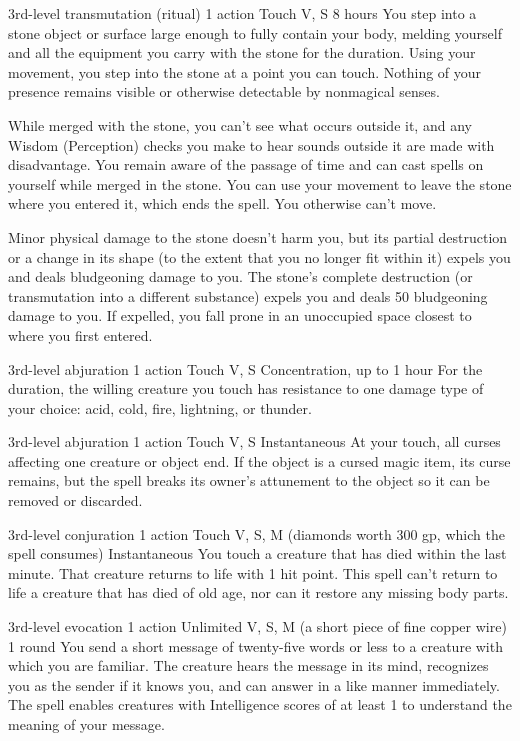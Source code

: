 \documentclass[10pt,twoside,twocolumn,openany]{book}
\begin{document}
{3rd-level transmutation {\color{ritual}(ritual)}}
{\color{action} 1 action}
{Touch}
{V, S}
{8 hours}
You step into a stone object or surface large enough to fully contain your body, melding yourself and all the equipment you carry with the stone for the duration. Using your movement, you step into the stone at a point you can touch. Nothing of your presence remains visible or otherwise detectable by nonmagical senses.

While merged with the stone, you can't see what occurs outside it, and any Wisdom (Perception) checks you make to hear sounds outside it are made with disadvantage. You remain aware of the passage of time and can cast spells on yourself while merged in the stone. You can use your movement to leave the stone where you entered it, which ends the spell. You otherwise can't move.

Minor physical damage to the stone doesn't harm you, but its partial destruction or a change in its shape (to the extent that you no longer fit within it) expels you and deals  bludgeoning damage to you. The stone's complete destruction (or transmutation into a different substance) expels you and deals 50 bludgeoning damage to you. If expelled, you fall prone in an unoccupied space closest to where you first entered.

{3rd-level abjuration}
{\color{action} 1 action}
{Touch}
{V, S}
{{\color{concentration}Concentration}, up to 1 hour}
For the duration, the willing creature you touch has resistance to one damage type of your choice: acid, cold, fire, lightning, or thunder.

{3rd-level abjuration}
{\color{action} 1 action}
{Touch}
{V, S}
{Instantaneous}
At your touch, all curses affecting one creature or object end. If the object is a cursed magic item, its curse remains, but the spell breaks its owner's attunement to the object so it can be removed or discarded.

{3rd-level conjuration}
{\color{action} 1 action}
{Touch}
{V, S, M (diamonds worth {\color{cost}300 gp}, which the spell consumes)}
{Instantaneous}
You touch a creature that has died within the last minute. That creature returns to life with 1 hit point. This spell can't return to life a creature that has died of old age, nor can it restore any missing body parts.

{3rd-level evocation}
{\color{action} 1 action}
{Unlimited}
{V, S, M (a short piece of fine copper wire)}
{1 round}
You send a short message of twenty-five words or less to a creature with which you are familiar. The creature hears the message in its mind, recognizes you as the sender if it knows you, and can answer in a like manner immediately. The spell enables creatures with Intelligence scores of at least 1 to understand the meaning of your message.
\end{document}
